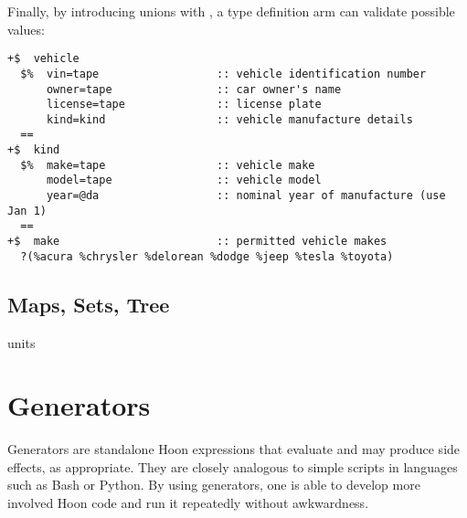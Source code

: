 Finally, by introducing unions with \bucwut, a type definition arm can validate possible values:

\begin{lstlisting}[style=nonumbers]
+$  vehicle
  $%  vin=tape                  :: vehicle identification number
      owner=tape                :: car owner's name
      license=tape              :: license plate
      kind=kind                 :: vehicle manufacture details
  ==
+$  kind
  $%  make=tape                 :: vehicle make
      model=tape                :: vehicle model
      year=@da                  :: nominal year of manufacture (use Jan 1)
  ==
+$  make                        :: permitted vehicle makes
  ?(%acura %chrysler %delorean %dodge %jeep %tesla %toyota)
\end{lstlisting}


\subsection{Maps, Sets, Tree}

units

\section{Generators}

Generators are standalone Hoon expressions that evaluate and may produce side effects, as appropriate.  They are closely analogous to simple scripts in languages such as Bash or Python.  By using generators, one is able to develop more involved Hoon code and run it repeatedly without awkwardness.


